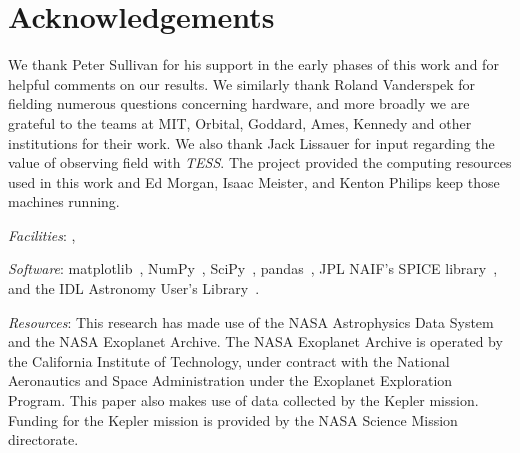 \section*{Acknowledgements}
We thank Peter Sullivan for his support in the early phases of this 
work and for helpful comments on our results.
We similarly thank Roland Vanderspek for fielding numerous questions
concerning \tess hardware, and more broadly we are grateful to the teams 
at MIT, Orbital, Goddard, Ames, Kennedy and other institutions for 
their work.
We also thank Jack Lissauer for input regarding the value of observing 
\keplers field with \textit{TESS}.
The \tess project provided the computing resources used in this work and Ed 
Morgan, Isaac Meister, and Kenton Philips keep those machines running.

\vspace{0.5cm}
\textit{Facilities}: \tess\!, \kepler

\textit{Software}: matplotlib~\citep{hunter_matplotlib_2007}, NumPy~\citep{walt_numpy_2011}, SciPy~\citep{jones_scipy_2001}, pandas~\citep{mckinneypandas}, JPL NAIF's SPICE library~\citep{acton_SPICE_1996}, and the IDL Astronomy User's Library~\citep{landsman_idl_1995}.

\textit{Resources}: This research has made use of the NASA Astrophysics Data System and the NASA Exoplanet Archive. The NASA Exoplanet Archive is operated by the California Institute of Technology, under contract with the National Aeronautics and Space Administration under the Exoplanet Exploration Program.
This paper also makes use of data collected by the Kepler mission. Funding for the Kepler mission is provided by the NASA Science Mission directorate.
